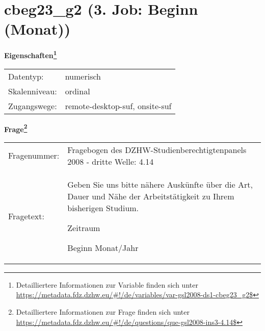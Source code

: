 
    \setcounter{footnote}{0}

    \vspace*{-1.8cm}
	\section{cbeg23\_g2 (3. Job: Beginn (Monat))}
	\label{section:cbeg23_g2}



    \vspace*{0.5cm}
    \noindent\textbf{Eigenschaften\footnote{Detailliertere Informationen zur Variable finden sich unter
		\url{https://metadata.fdz.dzhw.eu/\#!/de/variables/var-gsl2008-ds1-cbeg23_g2$}}}\\
	\begin{tabularx}{\hsize}{@{}lX}
	Datentyp: & numerisch \\
	Skalenniveau: & ordinal \\
	Zugangswege: &
	  remote-desktop-suf, 
	  onsite-suf
 \\
    \end{tabularx}



				\vspace*{0.5cm}
                \noindent\textbf{Frage\footnote{Detailliertere Informationen zur Frage finden sich unter
		              \url{https://metadata.fdz.dzhw.eu/\#!/de/questions/que-gsl2008-ins3-4.14$}}}\\
				\begin{tabularx}{\hsize}{@{}lX}
					Fragenummer: &
					  Fragebogen des DZHW-Studienberechtigtenpanels 2008 - dritte Welle:
					  4.14
 \\
					Fragetext: & Geben Sie uns bitte nähere Auskünfte über die Art, Dauer und Nähe der Arbeitstätigkeit zu Ihrem bisherigen Studium.\par  Zeitraum\par  Beginn Monat/Jahr \\
				\end{tabularx}





